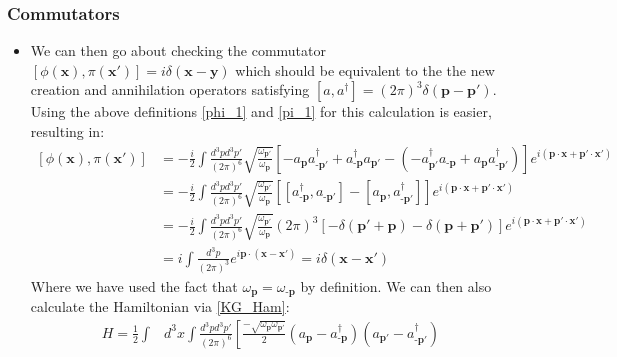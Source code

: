 \documentclass[11pt]{article}
\numberwithin{equation}{section}
\begin{document}
\subsubsection{Commutators}
\begin{itemize}
\item We can then go about checking the commutator $[\phi(\textbf{x}),\pi(\textbf{x}')]= i \delta(\textbf{x}-\textbf{y})$ which should be equivalent to the the new creation and annihilation operators satisfying $[a,a^{\dagger}] = (2 \pi)^{3}\delta(\textbf{p}-\textbf{p}')$. Using the above definitions \ref{phi_1} and \ref{pi_1} for this calculation is easier, resulting in:
\begin{equation}
\begin{split}
  [\phi(\textbf{x}),\pi(\textbf{x}')] & = -\frac{i}{2}\int \frac{d^3pd^3p'}{(2\pi)^6}\sqrt{\frac{\omega_{\textbf{p}'}}{\omega_{\textbf{p}}}}\left[-a_{\textbf{p}}a^{\dagger}_{\textbf{-p}'} + a^{\dagger}_{\textbf{-p}}a_{\textbf{p}'}-(-a^{\dagger}_{\textbf{p}'}a_{\textbf{-p}} + a_{\textbf{p}}a^{\dagger}_{\textbf{-p}'})\right]e^{i(\textbf{p}\cdot \textbf{x}+\textbf{p}'\cdot \textbf{x}')} \\ 
  &  = -\frac{i}{2}\int \frac{d^3pd^3p'}{(2\pi)^6}\sqrt{\frac{\omega_{\textbf{p}'}}{\omega_{\textbf{p}}}}\left[[a^{\dagger}_{\textbf{-p}},a_{\textbf{-p}'}]-[a_{\textbf{p}},a^{\dagger}_{\textbf{-p}'}]\right]e^{i(\textbf{p}\cdot \textbf{x}+\textbf{p}'\cdot \textbf{x}')}  \\ 
   & =  -\frac{i}{2}\int \frac{d^3pd^3p'}{(2\pi)^6}\sqrt{\frac{\omega_{\textbf{p}'}}{\omega_{\textbf{p}}}}(2\pi)^3\left[-\delta(\textbf{p}'+\textbf{p}) -\delta(\textbf{p}+\textbf{p}') \right]e^{i(\textbf{p}\cdot \textbf{x}+\textbf{p}'\cdot \textbf{x}')}  \\ 
   & = i\int \frac{d^3p}{(2\pi)^3}e^{i\textbf{p}\cdot( \textbf{x} -\textbf{x}')} = i\delta(\textbf{x} -\textbf{x}')  
  \end{split}
  \end{equation}  
  Where we have used the fact that $\omega_{\textbf{p}}=\omega_{\textbf{-p}}$ by definition. We can then also calculate the Hamiltonian via \ref{KG_Ham}:
  \begin{equation*}
    \begin{split}
      H  = \frac{1}{2}\int &d^3x\int\frac{d^3pd^3p'}{(2\pi)^6}\left[\frac{-\sqrt{\omega_{\textbf{p}}\omega_{\textbf{p}'}}}{2}\left(a_{\textbf{p}}-a^{\dagger}_{\textbf{-p}}\right)\left(a_{\textbf{p}'}-a^{\dagger}_{\textbf{-p}'}\right)\right. \\

\end{split}
\end{equation*}
\end{itemize}
\end{document}
